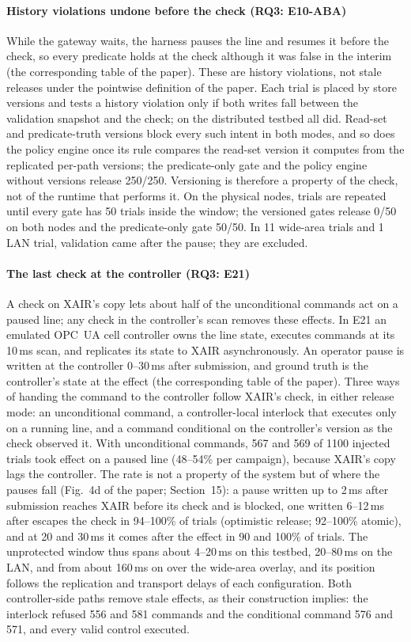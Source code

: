 \documentclass[11pt]{article}
\begin{document}
\paragraph{History violations undone before the check (RQ3: E10-ABA)}
While the gateway waits, the harness pauses the line and resumes it before the check, so every predicate holds at the check although it was false in the interim (the corresponding table of the paper). These are history violations, not stale releases under the pointwise definition of the paper. Each trial is placed by store versions and tests a history violation only if both writes fall between the validation snapshot and the check; on the distributed testbed all did. Read-set and predicate-truth versions block every such intent in both modes, and so does the policy engine once its rule compares the read-set version it computes from the replicated per-path versions; the predicate-only gate and the policy engine without versions release 250/250. Versioning is therefore a property of the check, not of the runtime that performs it. On the physical nodes, trials are repeated until every gate has 50 trials inside the window; the versioned gates release 0/50 on both nodes and the predicate-only gate 50/50. In 11 wide-area trials and 1 LAN trial, validation came after the pause; they are excluded.

\paragraph{The last check at the controller (RQ3: E21)}
A check on XAIR's copy lets about half of the unconditional commands act on a paused line; any check in the controller's scan removes these effects. In E21 an emulated OPC~UA cell controller owns the line state, executes commands at its 10\,ms scan, and replicates its state to XAIR asynchronously. An operator pause is written at the controller 0--30\,ms after submission, and ground truth is the controller's state at the effect (the corresponding table of the paper). Three ways of handing the command to the controller follow XAIR's check, in either release mode: an unconditional command, a controller-local interlock that executes only on a running line, and a command conditional on the controller's version as the check observed it. With unconditional commands, 567 and 569 of 1100 injected trials took effect on a paused line (48--54\% per campaign), because XAIR's copy lags the controller. The rate is not a property of the system but of where the pauses fall (Fig.~4d of the paper; Section~15): a pause written up to 2\,ms after submission reaches XAIR before its check and is blocked, one written 6--12\,ms after escapes the check in 94--100\% of trials (optimistic release; 92--100\% atomic), and at 20 and 30\,ms it comes after the effect in 90 and 100\% of trials. The unprotected window thus spans about 4--20\,ms on this testbed, 20--80\,ms on the LAN, and from about 160\,ms on over the wide-area overlay, and its position follows the replication and transport delays of each configuration. Both controller-side paths remove stale effects, as their construction implies: the interlock refused 556 and 581 commands and the conditional command 576 and 571, and every valid control executed.
\end{document}
